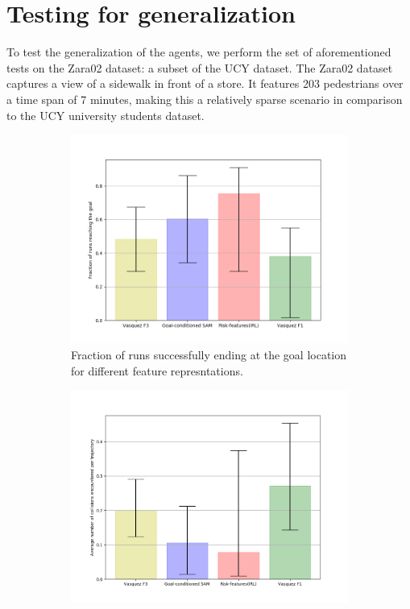 \vspace{4cm}
\section{Testing for generalization}
\label{sec:generalization}
To test the generalization of the agents, we perform the set of aforementioned tests on the Zara02 dataset: a subset of the UCY dataset. The Zara02 dataset captures a view of a sidewalk in front of a store. It features 203 pedestrians over a time span of 7 minutes, making this a relatively sparse scenario in comparison to the UCY university students dataset.

\begin{figure}[htbp]
	\begin{subfigure}[t]{.5\columnwidth}
	\centering
	\includegraphics[width=\columnwidth]{plots/zara02_inter_irl_adjusted_speed/goal_reached_zara02_adjusted_inter_irl.png}
	\caption{Fraction of runs successfully ending at the goal location for different feature represntations.}
	\label{fig:inter_method-goal_reached-zara02}
	\end{subfigure}%
	\begin{subfigure}[t]{.5\columnwidth}
		\centering
		\includegraphics[width=\columnwidth]{plots/zara02_inter_irl_adjusted_speed/count_collisions_zara02_adjusted_inter_irl.png}

\end{subfigure}
\end{figure}
